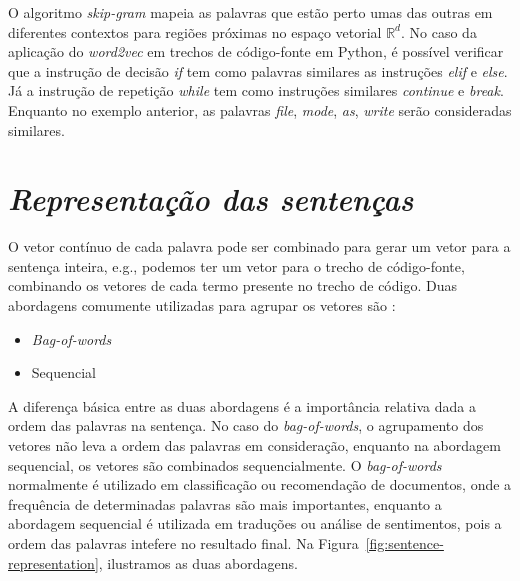 O algoritmo \textit{skip-gram} mapeia as palavras que estão perto umas das outras em diferentes contextos para regiões próximas no espaço vetorial $\mathbb{R}^{d}$. No caso da aplicação do \textit{word2vec} em trechos de código-fonte em Python, é possível verificar que a instrução de decisão \emph{if} tem como palavras similares as instruções \emph{elif} e \emph{else}. Já a instrução de repetição \emph{while} tem como instruções similares \emph{continue} e \textit{break}. Enquanto no exemplo anterior, as palavras \emph{file}, \emph{mode}, \emph{as}, \emph{write} serão consideradas similares. 


\section{\textit{Representação das sentenças}}
\label{sec:representacao-das-sentencas-fundamentacao-teorica}

O vetor contínuo de cada palavra pode ser combinado para gerar um vetor para a sentença inteira, e.g., podemos ter um vetor para o trecho de código-fonte, combinando os vetores de cada termo presente no trecho de código. Duas abordagens comumente utilizadas para agrupar os vetores são \citep{cambronero-deep-learning-code-search:2019}:

\begin{itemize}
    \item \textit{Bag-of-words}
    \item Sequencial
\end{itemize}

A diferença básica entre as duas abordagens é a importância relativa dada a ordem das palavras na sentença. No caso do \textit{bag-of-words}, o agrupamento dos vetores não leva a ordem das palavras em consideração, enquanto na abordagem sequencial, os vetores são combinados sequencialmente. O \textit{bag-of-words} normalmente é utilizado em classificação ou recomendação de documentos, onde a frequência de determinadas palavras são mais importantes, enquanto a abordagem sequencial é utilizada em traduções ou análise de sentimentos, pois a ordem das palavras intefere no resultado final. Na Figura~\ref{fig:sentence-representation}, ilustramos as duas abordagens.

